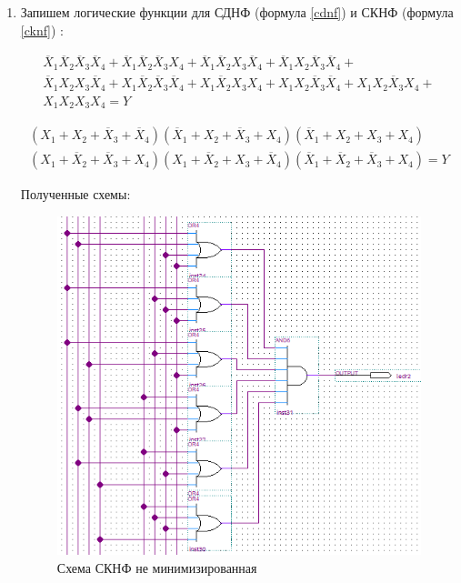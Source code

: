 \documentclass[a4paper,14pt]{article}
\begin{document}
\begin{enumerate}
	\item Запишем логические функции для СДНФ (формула \ref{cdnf}) и СКНФ (формула \ref{cknf}) :
	
	\begin{equation}\label{cdnf}
		\begin{gathered}
	\overline X_1 \overline X_2 \overline X_3 \overline X_4 + 
	\overline X_1 \overline X_2 \overline X_3  X_4  + 
	\overline X_1 \overline X_2  X_3 \overline X_4  + 
	\overline X_1  X_2 \overline X_3 \overline X_4  + \\
	\overline X_1  X_2  X_3 \overline X_4  + 
	 X_1 \overline X_2 \overline X_3 \overline X_4  + 
	 X_1 \overline X_2  X_3  X_4  + 
	 X_1  X_2 \overline X_3 \overline X_4  + 
	 X_1  X_2 \overline X_3  X_4  + \\
	 X_1  X_2  X_3  X_4 = Y 
	\end{gathered}
	\end{equation}
	
	\begin{equation}\label{cknf}
	\begin{gathered}
	( X_1 +  X_2 + \overline X_3 + \overline X_4)  
	(\overline X_1 +  X_2 + \overline X_3 +  X_4)  
	(\overline X_1 +  X_2 +  X_3 +  X_4)  \\
	( X_1 + \overline X_2 + \overline X_3 +  X_4)  
	( X_1 + \overline X_2 +  X_3 + \overline X_4)  
	(\overline X_1 + \overline X_2 + \overline X_3 +  X_4) = Y
	\end{gathered}
	\end{equation}
	
	Полученные схемы:
	
	\begin{figure}[H]
		\centering
		\includegraphics[width=0.7\linewidth]{image/02_SKNFne}
		\caption{Схема СКНФ не минимизированная}
		\label{fig:02sknfne}
	\end{figure}
	

\end{enumerate}
\end{document}
